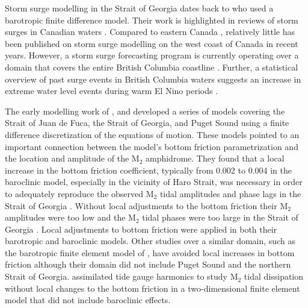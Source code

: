 \documentclass[letterpaper]{tATO2e}
\begin{document}
Storm surge modelling in the Strait of Georgia dates back to \citet{crean1988mathematical} who used a barotropic finite difference model. Their work is highlighted in reviews of storm surges in Canadian waters \citep{murty1995storm, danard2003storm}.  Compared to eastern Canada \citep{gray1984preliminary, bernier2006predicting,bobanovic2006forecasting, bernier2007tide, bernier2010tide, ma2015oceanic}, relatively little has been published on storm surge modelling on the west coast of Canada in recent years. However, a storm surge forecasting program is currently operating over a domain that covers the entire British Columbia coastline \citep{StormBC}. Further, a statistical overview of past surge events in British Columbia waters suggests an increase in extreme water level events during warm El Nino periods \citep{abeys2011extreme}.

The early modelling work of \citet{crean1988mathematical}, \citet{crean1988numerical} and \citet{stronach1993update} {\color{red} developed} a series of models covering the Strait of Juan de Fuca, the Strait of Georgia, and Puget Sound using a finite difference discretization of the equations of motion. %
These models pointed to an important connection between the model's bottom friction parametrization and the location and amplitude of the M$_2$ amphidrome. They found that a local increase in the bottom friction coefficient, typically from 0.002 to 0.004 in the baroclinic model, especially in the vicinity of Haro Strait, was necessary in order to adequately reproduce the observed M$_2$ tidal amplitudes and phase lags in the Strait of Georgia \citep{stronach1993update}. Without local adjustments to the bottom friction their M$_2$ amplitudes were too low and the M$_2$ tidal phases were too large in the Strait of Georgia \citep{crean1988mathematical}. Local adjustments to bottom friction were applied in both their barotropic and baroclinic models.  Other studies over a similar domain, such as the barotropic finite element model of \citet{foreman1995tidal}, have avoided local increases in bottom friction although their domain did not include Puget Sound and the northern Strait of Georgia. \citet{foreman2004m} assimilated tide gauge harmonics to study M$_2$ tidal dissipation without local changes to the bottom friction in a two-dimensional finite element model that did not include baroclinic effects. 
\end{document}
